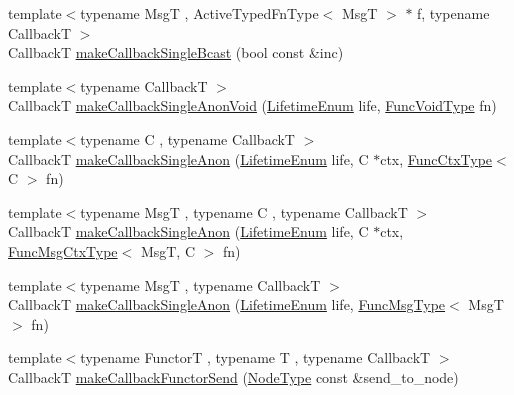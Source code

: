\begin{DoxyCompactItemize}
\item 
{\footnotesize template$<$typename MsgT , Active\+Typed\+Fn\+Type$<$ Msg\+T $>$ $\ast$ f, typename CallbackT $>$ }\\CallbackT \hyperlink{structvt_1_1pipe_1_1_pipe_manager_t_l_a833e03e949cc04c1a801780eb71fd7e1}{make\+Callback\+Single\+Bcast} (bool const \&inc)
\item 
{\footnotesize template$<$typename CallbackT $>$ }\\CallbackT \hyperlink{structvt_1_1pipe_1_1_pipe_manager_t_l_a92e209618d7e21e150a1f13ae4e813d4}{make\+Callback\+Single\+Anon\+Void} (\hyperlink{namespacevt_1_1pipe_acb42b284378c0fdac1d7c6335dc26f58}{Lifetime\+Enum} life, \hyperlink{structvt_1_1pipe_1_1_pipe_manager_base_acd6f0c71f38f08d53f85e83b65406d77}{Func\+Void\+Type} fn)
\item 
{\footnotesize template$<$typename C , typename CallbackT $>$ }\\CallbackT \hyperlink{structvt_1_1pipe_1_1_pipe_manager_t_l_ac74f387c8ea9f25e11ca53841cd01779}{make\+Callback\+Single\+Anon} (\hyperlink{namespacevt_1_1pipe_acb42b284378c0fdac1d7c6335dc26f58}{Lifetime\+Enum} life, C $\ast$ctx, \hyperlink{structvt_1_1pipe_1_1_pipe_manager_base_ad8463823b6b4cfdb67c119d6d22e3bac}{Func\+Ctx\+Type}$<$ C $>$ fn)
\item 
{\footnotesize template$<$typename MsgT , typename C , typename CallbackT $>$ }\\CallbackT \hyperlink{structvt_1_1pipe_1_1_pipe_manager_t_l_aa84891c7d419709ee96473a895d07ae7}{make\+Callback\+Single\+Anon} (\hyperlink{namespacevt_1_1pipe_acb42b284378c0fdac1d7c6335dc26f58}{Lifetime\+Enum} life, C $\ast$ctx, \hyperlink{structvt_1_1pipe_1_1_pipe_manager_base_a73fdf82ece0411b3dc644c99b763f7a9}{Func\+Msg\+Ctx\+Type}$<$ MsgT, C $>$ fn)
\item 
{\footnotesize template$<$typename MsgT , typename CallbackT $>$ }\\CallbackT \hyperlink{structvt_1_1pipe_1_1_pipe_manager_t_l_a1b3d31ba2e73d77ef2ed5c7f752d2eb9}{make\+Callback\+Single\+Anon} (\hyperlink{namespacevt_1_1pipe_acb42b284378c0fdac1d7c6335dc26f58}{Lifetime\+Enum} life, \hyperlink{structvt_1_1pipe_1_1_pipe_manager_base_aa54eee64ab32a27777a672d49eb861f4}{Func\+Msg\+Type}$<$ MsgT $>$ fn)
\item 
{\footnotesize template$<$typename FunctorT , typename T , typename CallbackT $>$ }\\CallbackT \hyperlink{structvt_1_1pipe_1_1_pipe_manager_t_l_a2e9eb336fb5e2f6927b64068411ff2c8}{make\+Callback\+Functor\+Send} (\hyperlink{namespacevt_a866da9d0efc19c0a1ce79e9e492f47e2}{Node\+Type} const \&send\+\_\+to\+\_\+node)

\end{DoxyCompactItemize}
